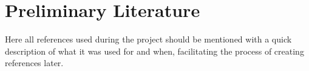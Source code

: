 \section{Preliminary Literature}
Here all references used during the project should be mentioned with a quick description of what it was used for and when, facilitating the process of creating references later.